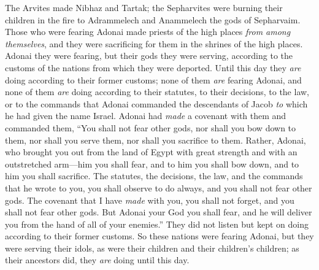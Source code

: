 \begin{biblechapter}
\verse The Arvites made Nibhaz and Tartak; the Sepharvites were burning their children in the fire to Adrammelech and Anammelech the gods of Sepharvaim.
\verse Those who were fearing Adonai made priests of the high places \textit{from among themselves}, and they were sacrificing for them in the shrines of the high places.
\verse Adonai they were fearing, but their gods they were serving, according to the customs of the nations from which they were deported.
\verse Until this day they \textit{are} doing according to their former customs; none of them \textit{are} fearing Adonai, and none of them \textit{are} doing according to their statutes, to their decisions, to the law, or to the commands that Adonai commanded the descendants of Jacob \textit{to} which he had given the name Israel.
\verse Adonai had \textit{made} a covenant with them and commanded them, “You shall not fear other gods, nor shall you bow down to them, nor shall you serve them, nor shall you sacrifice to them.
\verse Rather, Adonai, who brought you out from the land of Egypt with great strength and with an outstretched arm—him you shall fear, and to him you shall bow down, and to him you shall sacrifice.
\verse The statutes, the decisions, the law, and the commands that he wrote to you, you shall observe to do always, and you shall not fear other gods.
\verse The covenant that I have \textit{made} with you, you shall not forget, and you shall not fear other gods.
\verse But Adonai your God you shall fear, and he will deliver you from the hand of all of your enemies.”
\verse They did not listen but kept on doing according to their former customs.
\verse So these nations were fearing Adonai, but they were serving their idols, as were their children and their children’s children; as their ancestors did, they \textit{are} doing until this day.
\end{biblechapter}

